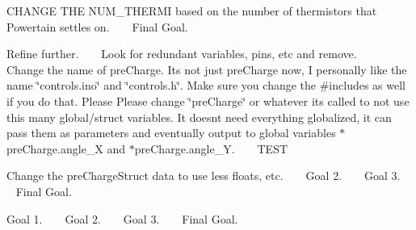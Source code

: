 \begin{DoxyRefList}
 CHANGE THE NUM\+\_\+\+THERMI based on the number of thermistors that Powertain settles on. ~\newline
 ~\newline
 Final Goal.  
\item[File \mbox{\hyperlink{_main_8ino}{Main.ino}} ]\label{todo__todo000008}%
%
 Refine further. ~\newline
 ~\newline
 Look for redundant variables, pins, etc and remove. ~\newline
 ~\newline
 Change the name of pre\+Charge. It\textquotesingle{}s not just pre\+Charge now, I personally like the name \char`\"{}controls.\+ino\char`\"{} and \char`\"{}controls.\+h\char`\"{}. Make sure you change the \#includes as well if you do that. Please Please change \char`\"{}pre\+Charge\char`\"{} or whatever it\textquotesingle{}s called to not use this many global/struct variables. It doesn\textquotesingle{}t need everything globalized, it can pass them as parameters and eventually output to global variables $\ast$pre\+Charge.angle\+\_\+X and $\ast$pre\+Charge.angle\+\_\+Y. ~\newline
 ~\newline
 TEST  
\item[File \mbox{\hyperlink{_precharge_8h}{Precharge.h}} ]\label{todo__todo000009}%
%
 Change the pre\+Charge\+Struct data to use less floats, etc. ~\newline
 ~\newline
 Goal 2. ~\newline
 ~\newline
 Goal 3. ~\newline
 ~\newline
 Final Goal.  
\item[File \mbox{\hyperlink{_pre_charge_8ino}{Pre\+Charge.ino}} ]\label{todo__todo000010}%
%
 Goal 1. ~\newline
 ~\newline
 Goal 2. ~\newline
 ~\newline
 Goal 3. ~\newline
 ~\newline
 Final Goal. 
\end{DoxyRefList}